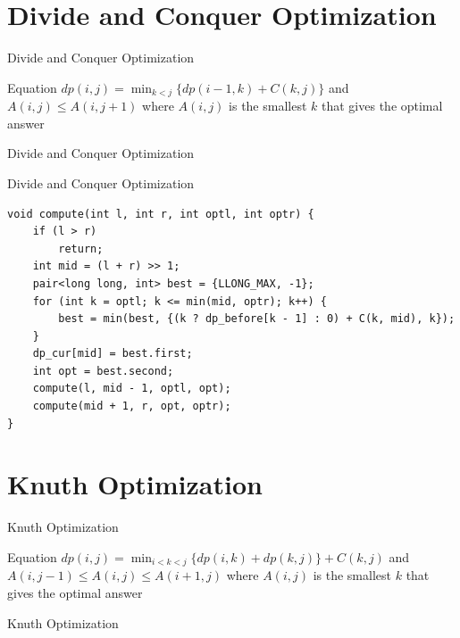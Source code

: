 \documentclass[aspectratio=169,xcolor=dvipsnames]{beamer}
\begin{document}

\section{Divide and Conquer Optimization}
\begin{frame}[plain]{Divide and Conquer Optimization}
\begin{block}{Equation}
        $dp(i, j) =  \displaystyle\min_{k < j}\{dp(i-1, k)+ C(k, j)\}$ and $A(i, j) \leq A(i, j+1)$ where $A(i, j)$ is the smallest $k$ that gives the optimal answer
\end{block}
\end{frame}

\begin{frame}[plain]{Divide and Conquer Optimization}

\end{frame}

\begin{frame}{Divide and Conquer Optimization}
\begin{examples}
\begin{verbatim}
void compute(int l, int r, int optl, int optr) {
    if (l > r)
        return;
    int mid = (l + r) >> 1;
    pair<long long, int> best = {LLONG_MAX, -1};
    for (int k = optl; k <= min(mid, optr); k++) {
        best = min(best, {(k ? dp_before[k - 1] : 0) + C(k, mid), k});
    }
    dp_cur[mid] = best.first;
    int opt = best.second;
    compute(l, mid - 1, optl, opt);
    compute(mid + 1, r, opt, optr);
}
\end{verbatim}
\end{examples}
\end{frame}


\section{Knuth Optimization}
\begin{frame}[plain]{Knuth Optimization}
\begin{block}{Equation}
        $dp(i, j) =  \displaystyle\min_{i < k < j}\{dp(i, k)+dp(k, j)\} +  C(k, j)$ and $A(i, j-1) \leq A(i, j) \leq A(i+1, j)$ where $A(i, j)$ is the smallest $k$ that gives the optimal answer
\end{block}
\end{frame}

\begin{frame}[plain]{Knuth Optimization}

\end{frame}
\end{document}
